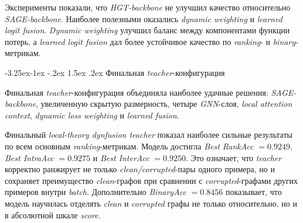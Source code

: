 \documentclass[a4paper,12pt]{extarticle}
\makeatletter
\renewcommand\subsubsection{\@startsection{subsubsection}{3}{\z@}%
  {-3.25ex\@plus -1ex \@minus -.2ex}%
  {1.5ex \@plus .2ex}%
  {\normalfont\normalsize\bfseries\Needspace{5\baselineskip}}}
\makeatother
\begin{document}
Эксперименты показали, что \textit{HGT-backbone} не улучшил качество относительно \textit{SAGE-backbone}. Наиболее полезными оказались \textit{dynamic weighting} и \textit{learned logit fusion}. \textit{Dynamic weighting} улучшил баланс между компонентами функции потерь, а \textit{learned logit fusion} дал более устойчивое качество по \textit{ranking}- и \textit{binary}-метрикам.

\subsubsection{Финальная \textit{teacher}-конфигурация}

Финальная \textit{teacher}-конфигурация объединяла наиболее удачные решения: \textit{SAGE-backbone}, увеличенную скрытую размерность, четыре \textit{GNN}-слоя, \textit{local attention context}, \textit{dynamic loss weighting} и \textit{learned fusion}.

\begin{table}[htbp]
\caption{Финальная \textit{teacher}-конфигурация}
\label{tab:5}
\centering
\scriptsize
{}
\end{table}

Финальный \textit{local-theory dynfusion teacher} показал наиболее сильные результаты по всем основным \textit{ranking}-метрикам. Модель достигла \textit{Best RankAcc} $=0.9249$, \textit{Best IntraAcc} $=0.9275$ и \textit{Best InterAcc} $=0.9250$. Это означает, что \textit{teacher} корректно ранжирует не только \textit{clean/corrupted}-пары одного примера, но и сохраняет преимущество \textit{clean}-графов при сравнении с \textit{corrupted}-графами других примеров внутри \textit{batch}. Дополнительно \textit{BinaryAcc} $=0.8456$ показывает, что модель научилась отделять \textit{clean} и \textit{corrupted} графы не только относительно, но и в абсолютной шкале \textit{score}.
\end{document}
